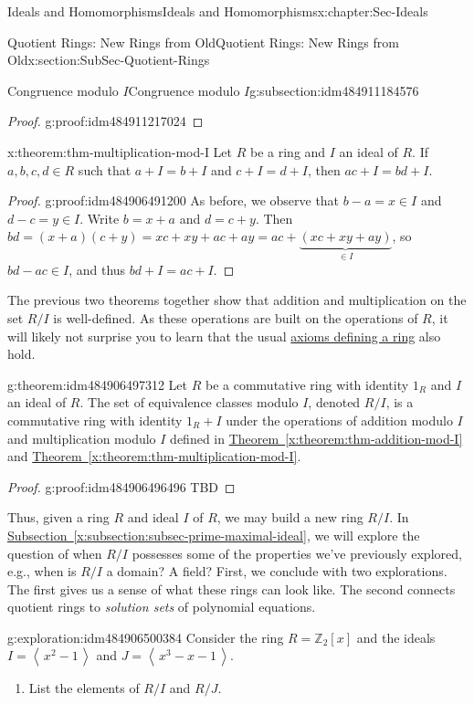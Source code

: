 \documentclass[oneside,10pt,]{book}
\newcommand{\xreffont}{\relax}
\numberwithin{equation}{section}
\newcommand{\ideal}[1]{\left\langle\, #1 \,\right\rangle}
\def\Z{{\mathbb Z}}
\begin{document}
\begin{chapterptx}{Ideals and Homomorphisms}{}{Ideals and Homomorphisms}{}{}{x:chapter:Sec-Ideals}
\begin{sectionptx}{Quotient Rings: New Rings from Old}{}{Quotient Rings: New Rings from Old}{}{}{x:section:SubSec-Quotient-Rings}
\begin{subsectionptx}{Congruence modulo \(I\)}{}{Congruence modulo \(I\)}{}{}{g:subsection:idm484911184576}
\begin{proof}{}{g:proof:idm484911217024}
\end{proof}
\begin{theorem}{}{}{x:theorem:thm-multiplication-mod-I}%
Let \(R\) be a ring and \(I\) an ideal of \(R\). If \(a,b,c,d\in R\) such that \(a+I = b+I\) and \(c+I = d+I\), then \(ac + I = bd + I\).%
\end{theorem}
\begin{proof}{}{g:proof:idm484906491200}
As before, we observe that \(b-a = x\in I\) and \(d-c = y\in I\). Write \(b = x+a\) and \(d = c+y\). Then \(bd = (x+a)(c+y) = xc + xy + ac + ay = ac + \underbrace{(xc+xy+ay)}_{\in I}\), so \(bd - ac \in I\), and thus \(bd + I = ac + I\).%
\end{proof}
The previous two theorems together show that addition and multiplication on the set \(R/I\) is well-defined. As these operations are built on the operations of \(R\), it will likely not surprise you to learn that the usual \hyperref[x:definition:def_ring]{axioms defining a ring} also hold.%
\begin{theorem}{}{}{g:theorem:idm484906497312}%
%
Let \(R\) be a commutative ring with identity \(1_R\) and \(I\) an ideal of \(R\). The set of equivalence classes modulo \(I\), denoted \(R/I\), is a commutative ring with identity \(1_R + I\) under the operations of addition modulo \(I\) and multiplication modulo \(I\) defined in \hyperref[x:theorem:thm-addition-mod-I]{Theorem~{\xreffont\ref{x:theorem:thm-addition-mod-I}}} and \hyperref[x:theorem:thm-multiplication-mod-I]{Theorem~{\xreffont\ref{x:theorem:thm-multiplication-mod-I}}}.%
\end{theorem}
\begin{proof}{}{g:proof:idm484906496496}
TBD\end{proof}
Thus, given a ring \(R\) and ideal \(I\) of \(R\), we may build a new ring \(R/I\). In \hyperref[x:subsection:subsec-prime-maximal-ideal]{Subsection~{\xreffont\ref{x:subsection:subsec-prime-maximal-ideal}}}, we will explore the question of when \(R/I\) possesses some of the properties we've previously explored, e.g., when is \(R/I\) a domain? A field? First, we conclude with two explorations. The first gives us a sense of what these rings can look like. The second connects quotient rings to \emph{solution sets} of polynomial equations.%
\begin{exploration}{}{g:exploration:idm484906500384}%
Consider the ring \(R=\Z_2[x]\) and the ideals \(I = \ideal{x^2-1}\) and \(J = \ideal{x^3 -x -1}\).%
%
\begin{enumerate}
\item{}List the elements of \(R/I\) and \(R/J\).%

\end{enumerate}
\end{exploration}
\end{subsectionptx}
\end{sectionptx}
\end{chapterptx}
\end{document}
